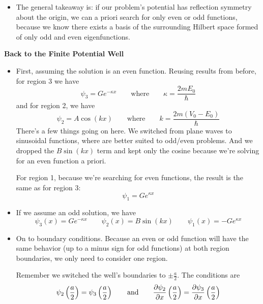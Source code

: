 \documentclass[11pt, a4paper]{article}
\newcommand{\eqtext}[1]{\qquad \text{#1} \qquad}
\begin{document}
\begin{itemize}
	\item The general takeaway is: if our problem's potential has reflection symmetry about the origin, we can a priori search for only even or odd functions, because we know there exists a basis of the surrounding Hilbert space formed of only odd and even eigenfunctions.
\end{itemize}
\textbf{Back to the Finite Potential Well}
\begin{itemize}
	\item First, assuming the solution is an even function. Reusing results from before, for region 3 we have
	\begin{equation*}
		\psi_{3} = Ge^{-\kappa x} \eqtext{where} \kappa = \frac{2mE_{0}}{\hbar}
	\end{equation*}
	and for region 2, we have
	\begin{equation*}
		\psi_{2} = A \cos(kx) \eqtext{where} k = \frac{2m(V_{0} - E_{0})}{\hbar}
	\end{equation*}
	There's a few things going on here. We switched from plane waves to sinusoidal functions, where are better suited to odd/even problems. And we dropped the $B\sin(kx)$ term and kept only the cosine because we're solving for an even function a priori.
	
	For region 1, because we're searching for even functions, the result is the same as for region 3:
	\begin{equation*}
		\psi_{1} = G e^{\kappa x}
	\end{equation*}
	
	\item If we assume an odd solution, we have
	\begin{equation*}
		\psi_{3}(x) = G e^{-\kappa x} \qquad \psi_{2}(x) = B \sin (kx) \qquad \psi_{1}(x) = -Ge^{\kappa x}
	\end{equation*}
	
	\item On to boundary conditions. Because an even or odd function will have the same behavior (up to a minus sign for odd functions) at both region boundaries, we only need to consider one region. 
	
	Remember we switched the well's boundaries to $ \pm \frac{a}{2} $. The conditions are
	\begin{equation*}
		\psi_{2}\left(\frac{a}{2}\right) = \psi_{3}\left(\frac{a}{2}\right) \eqtext{and} \pdv{\psi_{2}}{x}\left(\frac{a}{2}\right) = \pdv{\psi_{3}}{x}\left(\frac{a}{2}\right) 
	\end{equation*}
	

\end{itemize}
\end{document}
